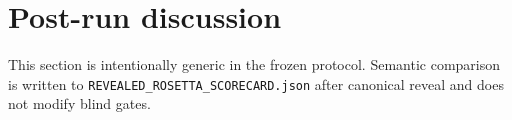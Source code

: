 \section*{Post-run discussion}
This section is intentionally generic in the frozen protocol. Semantic comparison is written to \texttt{REVEALED\_ROSETTA\_SCORECARD.json} after canonical reveal and does not modify blind gates.
